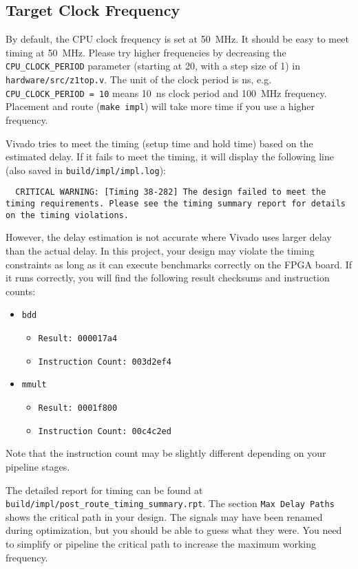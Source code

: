 \subsection{Target Clock Frequency}\label{sec:target_clock_frequency}
By default, the CPU clock frequency is set at 50~MHz.
It should be easy to meet timing at 50~MHz.
Please try higher frequencies by decreasing the \verb|CPU_CLOCK_PERIOD| parameter
(starting at 20, with a step size of 1) in \verb|hardware/src/z1top.v|.
The unit of the clock period is ns,
e.g. \verb|CPU_CLOCK_PERIOD = 10| means 10~ns clock period and 100~MHz frequency.
Placement and route (\verb|make impl|) will take more time if you use a higher frequency.

Vivado tries to meet the timing (setup time and hold time) based on the estimated delay.
If it fails to meet the timing, it will display the following line (also saved in \verb|build/impl/impl.log|):
\begin{verbatim}
  CRITICAL WARNING: [Timing 38-282] The design failed to meet the timing requirements. Please see the timing summary report for details on the timing violations.
\end{verbatim}
However, the delay estimation is not accurate where Vivado uses larger delay than the actual delay.
In this project, your design may violate the timing constraints as long as it can execute benchmarks correctly on the FPGA board.
If it runs correctly, you will find the following result checksums and instruction counts:
\begin{itemize}
\item \verb|bdd|
  \begin{itemize}
  \item \verb|Result: 000017a4|
  \item \verb|Instruction Count: 003d2ef4|
  \end{itemize}
\item \verb|mmult|
  \begin{itemize}
  \item \verb|Result: 0001f800|
  \item \verb|Instruction Count: 00c4c2ed|
  \end{itemize}
\end{itemize}
Note that the instruction count may be slightly different depending on your pipeline stages.

The detailed report for timing can be found at \verb|build/impl/post_route_timing_summary.rpt|.
The section \verb|Max Delay Paths| shows the critical path in your design.
The signals may have been renamed during optimization, but you should be able to guess what they were.
You need to simplify or pipeline the critical path to increase the maximum working frequency.

